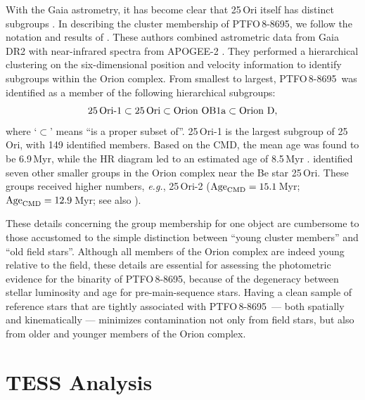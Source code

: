 \documentclass[12pt,twocolumn,tighten]{aastex62}
\newcommand{\ptfo}{PTFO$\,$8-8695}
\begin{document}
With the Gaia astrometry, it has become clear that 25$\,$Ori itself
has distinct subgroups
\citep{kounkel_apogee2_2018,briceno_cidaII_2019}.  In describing the
cluster membership of \ptfo, we follow the notation and results of
\citet{kounkel_apogee2_2018}.  These authors combined astrometric data
from Gaia DR2 with near-infrared spectra from APOGEE-2
\citep{gunn_sdss_2006,majewski_apache_2017,blanton_sloan_2017,zasowski_target_2017,cottle_apogee2_2018}.
They performed a hierarchical clustering on the six-dimensional
position and velocity information to identify subgroups within the
Orion complex.  From smallest to largest, \ptfo\ was identified
as a member of the following hierarchical subgroups:
\begin{equation}
  {\rm 25\,Ori\text{-}1}
  \subset {\rm 25\,Ori}
  \subset {\rm Orion\ OB1a}
  \subset {\rm Orion\ D},
\end{equation}
where `$\subset$' means ``is a proper subset
of''.  25$\,$Ori-1 is the largest subgroup of 25$\,$Ori, with 149
identified members.  Based on the CMD, the mean age was found to be
6.9$\,$Myr, while the HR diagram led to an estimated age of 8.5$\,$Myr
\citep{kounkel_apogee2_2018}. 
\citet{kounkel_apogee2_2018} identified
seven other smaller groups in the Orion complex near the Be star
25$\,$Ori. These groups received higher numbers, {\it e.g.},
25$\,$Ori-2 (${\rm Age}_{\rm CMD} =15.1\,$Myr; ${\rm Age}_{\rm CMD}
=12.9\,$Myr; see also \citealt{briceno_cidaII_2019}).

These details concerning the group membership for one object are
cumbersome to those accustomed to the simple distinction between ``young cluster members''
and ``old field stars''.  Although all members of the Orion complex are
indeed young relative to the field, these details are essential for
assessing the photometric evidence for the binarity of \ptfo, because of
the degeneracy between stellar luminosity and age for
pre-main-sequence stars.  Having a clean sample of reference stars that are
tightly associated with \ptfo\ --- both spatially
and kinematically --- minimizes contamination
not only from field stars, but also from older and younger members of the
Orion complex.


\section{TESS Analysis}
\label{sec:tess}
\end{document}

